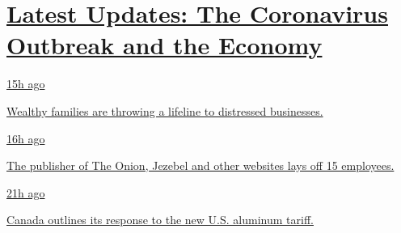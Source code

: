 \hypertarget{latest-updates-the-coronavirus-outbreak-and-the-economy}{%
\section{\texorpdfstring{\href{https://www.nytimes.com/live/2020/08/07/business/stock-market-today-coronavirus?action=click\&pgtype=Article\&state=default\&region=MAIN_CONTENT_1\&context=storylines_live_updates}{Latest
Updates: The Coronavirus Outbreak and the
Economy}}{Latest Updates: The Coronavirus Outbreak and the Economy}}\label{latest-updates-the-coronavirus-outbreak-and-the-economy}}

\href{https://www.nytimes.com/live/2020/08/07/business/stock-market-today-coronavirus?action=click\&pgtype=Article\&state=default\&region=MAIN_CONTENT_1\&context=storylines_live_updates\#wealthy-families-are-throwing-a-lifeline-to-distressed-businesses}{15h
ago}

\href{https://www.nytimes.com/live/2020/08/07/business/stock-market-today-coronavirus?action=click\&pgtype=Article\&state=default\&region=MAIN_CONTENT_1\&context=storylines_live_updates\#wealthy-families-are-throwing-a-lifeline-to-distressed-businesses}{Wealthy
families are throwing a lifeline to distressed businesses.}

\href{https://www.nytimes.com/live/2020/08/07/business/stock-market-today-coronavirus?action=click\&pgtype=Article\&state=default\&region=MAIN_CONTENT_1\&context=storylines_live_updates\#the-publisher-of-the-onion-jezebel-and-other-websites-lays-off-15-employees}{16h
ago}

\href{https://www.nytimes.com/live/2020/08/07/business/stock-market-today-coronavirus?action=click\&pgtype=Article\&state=default\&region=MAIN_CONTENT_1\&context=storylines_live_updates\#the-publisher-of-the-onion-jezebel-and-other-websites-lays-off-15-employees}{The
publisher of The Onion, Jezebel and other websites lays off 15
employees.}

\href{https://www.nytimes.com/live/2020/08/07/business/stock-market-today-coronavirus?action=click\&pgtype=Article\&state=default\&region=MAIN_CONTENT_1\&context=storylines_live_updates\#canada-outlines-its-response-to-the-new-us-aluminum-tariff}{21h
ago}

\href{https://www.nytimes.com/live/2020/08/07/business/stock-market-today-coronavirus?action=click\&pgtype=Article\&state=default\&region=MAIN_CONTENT_1\&context=storylines_live_updates\#canada-outlines-its-response-to-the-new-us-aluminum-tariff}{Canada
outlines its response to the new U.S. aluminum tariff.}

